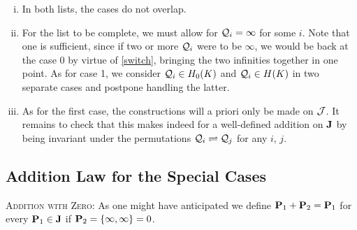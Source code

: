 \documentclass[english,11pt,a4paper]{article}
\begin{document}
\begin{remark}\label{rem}\hfill
\begin{enumerate}[(i)]
	\item In both lists, the cases do not overlap.
	
	\item For the list to be complete, we must allow for $\q_i = \infty$ for some $i$. Note that one is sufficient, since if two or more $\q_i$ were to be $\infty$, we would be back at the case 0 by virtue of \eqref{switch}, bringing the two infinities together in one point. As for case 1, we consider $\q_i \in \enk$ and $\q_i \in \ek$ in two separate cases and postpone handling the latter.\label{extend}

	\item As for the first case, the constructions will a priori only be made on $\j$. It remains to check that this makes indeed for a well-defined addition on $\J$ by being invariant under the permutations $\q_i \rightleftharpoons \q_j$ for any $i$, $j$.
\end{enumerate}
\end{remark}

\subsection{Addition Law for the Special Cases}

\setcounter{case}{-1}

\begin{case}
  {\scshape Addition with Zero:} As one might have anticipated we define $\P_1 + \P_2 = \P_1$ for every $\P_1 \in \J$ if $\P_2 = \{\infty, \infty\} = 0$.
\end{case}
\end{document}
